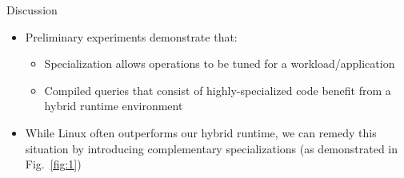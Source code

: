 \begin{block}{Discussion}

  \begin{itemize}
  \item Preliminary experiments demonstrate that:
    \begin{itemize}
    \item Specialization allows operations to be tuned for a workload/application
    \item Compiled queries that consist of highly-specialized code benefit from a hybrid runtime environment
    \end{itemize}
  \item While Linux often outperforms our hybrid runtime, we can remedy this situation by introducing complementary specializations (as demonstrated in Fig.~\ref{fig:1})
  \end{itemize}


\end{block}
